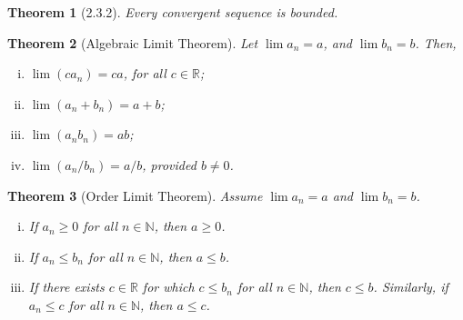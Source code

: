 \documentclass{article}
\newtheorem{theorem}{Theorem}
\begin{document}
\begin{theorem}[2.3.2]
    Every convergent sequence is bounded.
\end{theorem}

\begin{theorem}[Algebraic Limit Theorem]
    Let $\lim a_n = a$, and $\lim b_n = b$. Then,
    \begin{enumerate}[(i)]
        \item $\lim (ca_n) = ca$, for all $c \in \mathbb{R}$;
        \item $\lim (a_n + b_n) = a + b$;
        \item $\lim (a_nb_n)=ab$;
        \item $\lim (a_n/b_n)=a/b$, provided $b \neq 0$.
    \end{enumerate}
    
\end{theorem}


\begin{theorem}[Order Limit Theorem]
    Assume $\lim a_n = a$ and $\lim b_n = b$.
    \begin{enumerate}[(i)]
        \item If $a_n \geq 0$ for all $n \in \mathbb{N}$, then $a \geq 0$.
        \item If $a_n \leq b_n$ for all $n \in \mathbb{N}$, then $a \leq b$.
        \item If there exists $c \in \mathbb{R}$ for which $c \leq b_n$ for all $n \in \mathbb{N}$, then $c \leq b$. Similarly, if $a_n \leq c$ for all $n \in \mathbb{N}$, then $a \leq c$.
    \end{enumerate}
\end{theorem}
\end{document}
